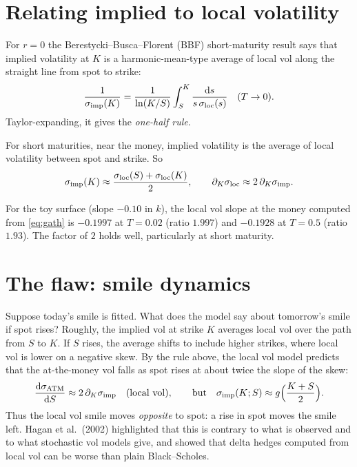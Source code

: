 \section{Relating implied to local volatility}

For $r=0$ the Berestycki--Busca--Florent (BBF) short-maturity result says that implied volatility at $K$ is a harmonic-mean-type average of local vol along the straight line from spot to strike:
\[
\frac{1}{\sigma_{\rm imp}(K)}=\frac{1}{\ln(K/S)}\int_S^K\frac{\mathrm{d} s}{s\,\sigma_{\rm loc}(s)}\quad(T\to0).
\]
Taylor-expanding, it gives the \emph{one-half rule}.

\begin{proposition}\label{prop:skewrule}
For short maturities, near the money, implied volatility is the average of local volatility between spot and strike. So
\[
\sigma_{\rm imp}(K)\approx\frac{\sigma_{\rm loc}(S)+\sigma_{\rm loc}(K)}{2},\qquad\partial_K\sigma_{\rm loc}\approx2\,\partial_K\sigma_{\rm imp}.
\]
\end{proposition}

\begin{numcheck}
For the toy surface (slope $-0.10$ in $k$), the local vol slope at the money computed from \eqref{eq:gath} is $-0.1997$ at $T=0.02$ (ratio $1.997$) and $-0.1928$ at $T=0.5$ (ratio $1.93$). The factor of $2$ holds well, particularly at short maturity.
\end{numcheck}

\section{The flaw: smile dynamics}

Suppose today's smile is fitted. What does the model say about tomorrow's smile if spot rises? Roughly, the implied vol at strike $K$ averages local vol over the path from $S$ to $K$. If $S$ rises, the average shifts to include higher strikes, where local vol is lower on a negative skew. By the rule above, the local vol model predicts that the at-the-money vol falls as spot rises at about twice the slope of the skew:
\[
\frac{\mathrm{d}\sigma_{\rm ATM}}{\mathrm{d} S}\approx2\,\partial_K\sigma_{\rm imp}\quad\text{(local vol)},\qquad\text{but}\quad\sigma_{\rm imp}(K;S)\approx g\Bigl(\frac{K+S}{2}\Bigr).
\]
Thus the local vol smile moves \emph{opposite} to spot: a rise in spot moves the smile left. Hagan et al.\ (2002) highlighted that this is contrary to what is observed and to what stochastic vol models give, and showed that delta hedges computed from local vol can be worse than plain Black--Scholes.

